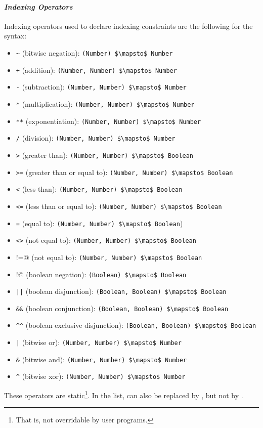 \paragraph{\em Indexing Operators}
Indexing operators used to declare indexing constraints are the following for the  syntax:
\begin{itemize}
\item \lstinline!~! (bitwise negation): \lstinline!(Number) $\mapsto$ Number!
\item \lstinline!+! (addition): \lstinline!(Number, Number) $\mapsto$ Number!
\item \lstinline!-! (subtraction): \lstinline!(Number, Number) $\mapsto$ Number!
\item \lstinline!*! (multiplication): \lstinline!(Number, Number) $\mapsto$ Number!
\item \lstinline!**! (exponentiation): \lstinline!(Number, Number) $\mapsto$ Number!
\item \lstinline!/! (division): \lstinline!(Number, Number) $\mapsto$ Number!
\item \lstinline!>! (greater than): \lstinline!(Number, Number) $\mapsto$ Boolean!
\item \lstinline!>=! (greater than or equal to): \lstinline!(Number, Number) $\mapsto$ Boolean!
\item \lstinline!<! (less than): \lstinline!(Number, Number) $\mapsto$ Boolean!
\item \lstinline!<=! (less than or equal to): \lstinline!(Number, Number) $\mapsto$ Boolean!
\item \lstinline!=! (equal to): \lstinline!(Number, Number) $\mapsto$ Boolean!)
\item \lstinline!<>! (not equal to): \lstinline!(Number, Number) $\mapsto$ Boolean!
\item \lstinline@!=@ (not equal to): \lstinline!(Number, Number) $\mapsto$ Boolean!
\item \lstinline@!@ (boolean negation): \lstinline!(Boolean) $\mapsto$ Boolean!
\item \lstinline!||! (boolean disjunction): \lstinline!(Boolean, Boolean) $\mapsto$ Boolean!
\item \lstinline!&&! (boolean conjunction): \lstinline!(Boolean, Boolean) $\mapsto$ Boolean!
\item \lstinline!^^! (boolean exclusive disjunction): \lstinline!(Boolean, Boolean) $\mapsto$ Boolean!
\item \lstinline!|! (bitwise or): \lstinline!(Number, Number) $\mapsto$ Number!
\item \lstinline!&! (bitwise and): \lstinline!(Number, Number) $\mapsto$ Number!
\item \lstinline!^! (bitwise xor): \lstinline!(Number, Number) $\mapsto$ Number!
\end{itemize}
These operators are static\footnote{That is, not overridable by user programs.}. In the list,  can also be replaced by , but not by . 

